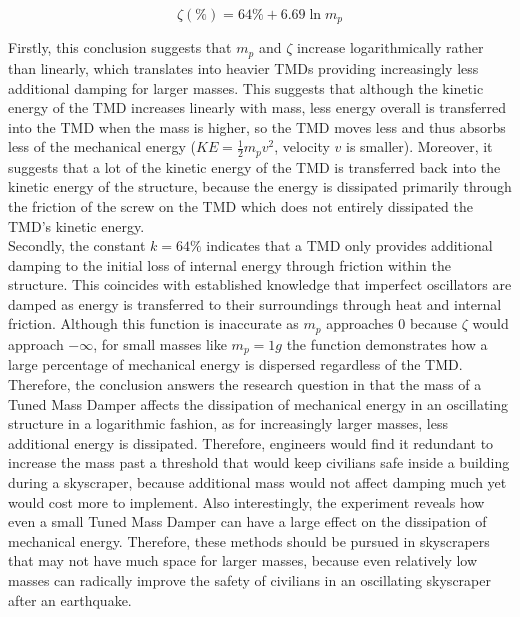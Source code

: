 \documentclass[11pt]{article}
\begin{document}
$$\zeta (\%) = 64\% + 6.69\ln m_p$$

Firstly, this conclusion suggests that $m_p$ and $\zeta$ increase logarithmically rather than linearly, which translates into heavier TMDs providing increasingly less additional damping for larger masses. This suggests that although the kinetic energy of the TMD increases linearly with mass, less energy overall is transferred into the TMD when the mass is higher, so the TMD moves less and thus absorbs less of the mechanical energy ($KE=\frac{1}{2}m_pv^2$, velocity $v$ is smaller). Moreover, it suggests that a lot of the kinetic energy of the TMD is transferred back into the kinetic energy of the structure, because the energy is dissipated primarily through the friction of the screw on the TMD which does not entirely dissipated the TMD's kinetic energy. \\


Secondly, the constant $k=64\%$ indicates that a TMD only provides additional damping to the initial loss of internal energy through friction within the structure. This coincides with established knowledge that imperfect oscillators are damped as energy is transferred to their surroundings through heat and internal friction. Although this function is inaccurate as $m_p$ approaches 0 because $\zeta$ would approach $-\infty$, for small masses like $m_p = 1g$ the function demonstrates how a large percentage of mechanical energy is dispersed regardless of the TMD. \\


Therefore, the conclusion answers the research question in that the mass of a Tuned Mass Damper affects the dissipation of mechanical energy in an oscillating structure in a logarithmic fashion, as for increasingly larger masses, less additional energy is dissipated. Therefore, engineers would find it redundant to increase the mass past a threshold that would keep civilians safe inside a building during a skyscraper, because additional mass would not affect damping much yet would cost more to implement. Also interestingly, the experiment reveals how even a small Tuned Mass Damper can have a large effect on the dissipation of mechanical energy. Therefore, these methods should be pursued in skyscrapers that may not have much space for larger masses, because even relatively low masses can radically improve the safety of civilians in an oscillating skyscraper after an earthquake. 

\end{document}

